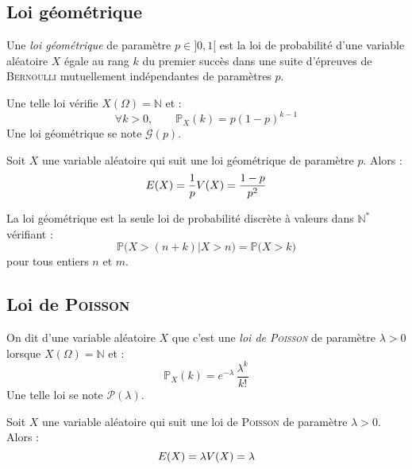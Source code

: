 \documentclass[11pt,a4paper,fleqn,pdftex]{report}
\begin{document}
\subsection{Loi géométrique}
\label{sub:loi_geometrique}
\begin{dfn}
     Une \emph{loi géométrique} de paramètre $p \in ]0, 1[$ est la loi de probabilité d'une variable aléatoire $X$ égale au rang $k$ du premier succès dans une suite d'épreuves de \textsc{Bernoulli} mutuellement indépendantes de paramètres $p$.\par
     Une telle loi vérifie $X(\Omega ) = \mathbb{N}$ et :
     \begin{equation}
     \forall k> 0,\qquad \mathbb{P}_X(k) = p (1-p)^{k-1}
     \end{equation}
     Une loi géométrique se note $\mathscr{G}(p)$.
\end{dfn}
\begin{theorem}
     Soit $X$ une variable aléatoire qui suit une loi géométrique de paramètre $p$. Alors : 
     \begin{equation}
     E(X) = \dfrac{1}{p} \\ V(X) = \dfrac{1-p}{p^2}
     \end{equation}
\end{theorem}
\begin{itheorem}
     La loi géométrique est la seule loi de probabilité discrète à valeurs dans $\mathbb{N}^*$ vérifiant : 
     \begin{equation}
     \mathbb{P}\Big( X > (n+k) \Big| X > n \Big) = \mathbb{P} \big( X > k \big)
     \end{equation}
     pour tous entiers $n$ et $m$.
\end{itheorem}
\subsection{Loi de \textsc{Poisson}} %
\label{sub:loi_de_poisson}
\begin{dfn}
     On dit d'une variable aléatoire $X$ que c'est une \emph{loi de \textsc{Poisson}} de paramètre $\lambda >0$ lorsque $X( \Omega ) = \mathbb{N}$ et :
     \begin{equation}
     \mathbb{P}_X (k) = e^{-\lambda}\, \dfrac{\lambda^k}{k !}
     \end{equation}
     Une telle loi se note $\mathscr{P}(\lambda )$.
\end{dfn}
\begin{theorem}
     Soit $X$ une variable aléatoire qui suit une loi de \textsc{Poisson} de paramètre $\lambda > 0$. Alors :
     \begin{equation}
     E(X) = \lambda \\ V(X) = \lambda
     \end{equation}
\end{theorem}
\end{document}

